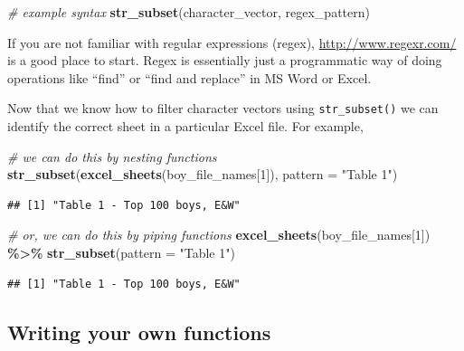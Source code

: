 \documentclass[
]{book}
\newenvironment{Shaded}{\begin{snugshade}}{\end{snugshade}}
\newcommand{\CommentTok}[1]{\textcolor[rgb]{0.56,0.35,0.01}{\textit{#1}}}
\newcommand{\DataTypeTok}[1]{\textcolor[rgb]{0.13,0.29,0.53}{#1}}
\newcommand{\DecValTok}[1]{\textcolor[rgb]{0.00,0.00,0.81}{#1}}
\newcommand{\KeywordTok}[1]{\textcolor[rgb]{0.13,0.29,0.53}{\textbf{#1}}}
\newcommand{\NormalTok}[1]{#1}
\newcommand{\OperatorTok}[1]{\textcolor[rgb]{0.81,0.36,0.00}{\textbf{#1}}}
\newcommand{\StringTok}[1]{\textcolor[rgb]{0.31,0.60,0.02}{#1}}
\begin{document}
\begin{Shaded}
\begin{Highlighting}[]
\CommentTok{\# example syntax}
\KeywordTok{str\_subset}\NormalTok{(character\_vector, regex\_pattern)}
\end{Highlighting}
\end{Shaded}

If you are not familiar with regular expressions (regex), \url{http://www.regexr.com/} is a good place to start. Regex is essentially just a programmatic way of doing operations like ``find'' or ``find and replace'' in MS Word or Excel.

Now that we know how to filter character vectors using \texttt{str\_subset()} we can identify the correct sheet in a particular Excel file. For example,

\begin{Shaded}
\begin{Highlighting}[]
\CommentTok{\# we can do this by nesting functions}
\KeywordTok{str\_subset}\NormalTok{(}\KeywordTok{excel\_sheets}\NormalTok{(boy\_file\_names[}\DecValTok{1}\NormalTok{]), }\DataTypeTok{pattern =} \StringTok{"Table 1"}\NormalTok{)}
\end{Highlighting}
\end{Shaded}

\begin{verbatim}
## [1] "Table 1 - Top 100 boys, E&W"
\end{verbatim}

\begin{Shaded}
\begin{Highlighting}[]
\CommentTok{\# or, we can do this by piping functions}
\KeywordTok{excel\_sheets}\NormalTok{(boy\_file\_names[}\DecValTok{1}\NormalTok{]) }\OperatorTok{\%\textgreater{}\%}\StringTok{ }\KeywordTok{str\_subset}\NormalTok{(}\DataTypeTok{pattern =} \StringTok{"Table 1"}\NormalTok{)}
\end{Highlighting}
\end{Shaded}

\begin{verbatim}
## [1] "Table 1 - Top 100 boys, E&W"
\end{verbatim}

\hypertarget{writing-your-own-functions}{%
\subsection{Writing your own functions}\label{writing-your-own-functions}}
\end{document}
